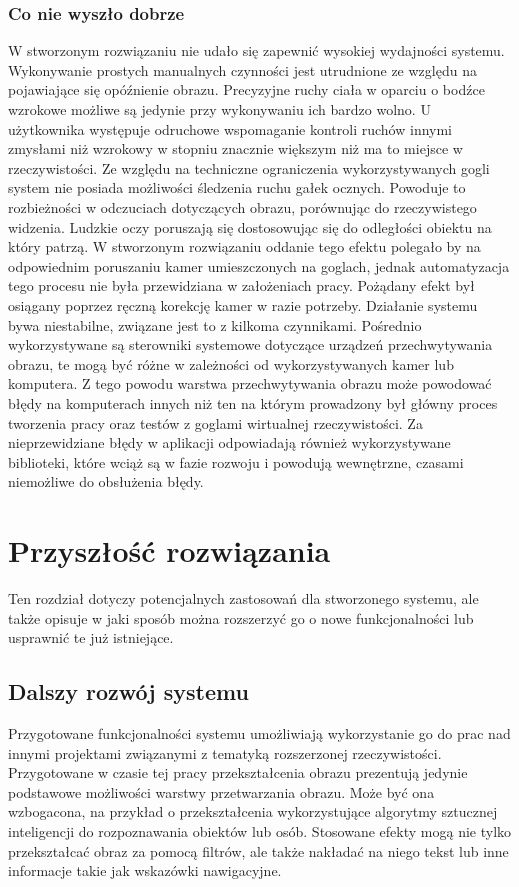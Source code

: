 \documentclass[a4paper,11pt,twoside]{report}
\theoremstyle{definition}
\begin{document}
\subsection{Co nie wyszło dobrze}

W stworzonym rozwiązaniu nie udało się zapewnić wysokiej wydajności systemu. Wykonywanie prostych manualnych czynności jest utrudnione ze względu na pojawiające się opóźnienie obrazu. Precyzyjne ruchy ciała w oparciu o bodźce wzrokowe możliwe są jedynie przy wykonywaniu ich bardzo wolno. U użytkownika występuje odruchowe wspomaganie kontroli ruchów innymi zmysłami niż wzrokowy w stopniu znacznie większym niż ma to miejsce w rzeczywistości. Ze względu na techniczne ograniczenia wykorzystywanych gogli system nie posiada możliwości śledzenia ruchu gałek ocznych. Powoduje to rozbieżności w odczuciach dotyczących obrazu, porównując do rzeczywistego widzenia. Ludzkie oczy poruszają się dostosowując się do odległości obiektu na który patrzą. W stworzonym rozwiązaniu oddanie tego efektu polegało by na odpowiednim poruszaniu kamer umieszczonych na goglach, jednak automatyzacja tego procesu nie była przewidziana w założeniach pracy. Pożądany efekt był osiągany poprzez ręczną korekcję kamer w razie potrzeby. Działanie systemu bywa niestabilne, związane jest to z kilkoma czynnikami. Pośrednio wykorzystywane są sterowniki systemowe dotyczące urządzeń przechwytywania obrazu, te mogą być różne w zależności od wykorzystywanych kamer lub komputera. Z tego powodu warstwa przechwytywania obrazu może powodować błędy na komputerach innych niż ten na którym prowadzony był główny proces tworzenia pracy oraz testów z goglami wirtualnej rzeczywistości. Za nieprzewidziane błędy w aplikacji odpowiadają również wykorzystywane biblioteki, które wciąż są w fazie rozwoju i powodują wewnętrzne, czasami niemożliwe do obsłużenia błędy.

\chapter{Przyszłość rozwiązania}

Ten rozdział dotyczy potencjalnych zastosowań dla stworzonego systemu, ale także opisuje w jaki sposób można rozszerzyć go o nowe funkcjonalności lub usprawnić te już istniejące.

\section{Dalszy rozwój systemu}

Przygotowane funkcjonalności systemu umożliwiają wykorzystanie go do prac nad innymi projektami związanymi z tematyką rozszerzonej rzeczywistości. Przygotowane w czasie tej pracy przekształcenia obrazu prezentują jedynie podstawowe możliwości warstwy przetwarzania obrazu. Może być ona wzbogacona, na przykład o przekształcenia wykorzystujące algorytmy sztucznej inteligencji do rozpoznawania obiektów lub osób. Stosowane efekty mogą nie tylko przekształcać obraz za pomocą filtrów, ale także nakładać na niego tekst lub inne informacje takie jak wskazówki nawigacyjne.
\end{document}

